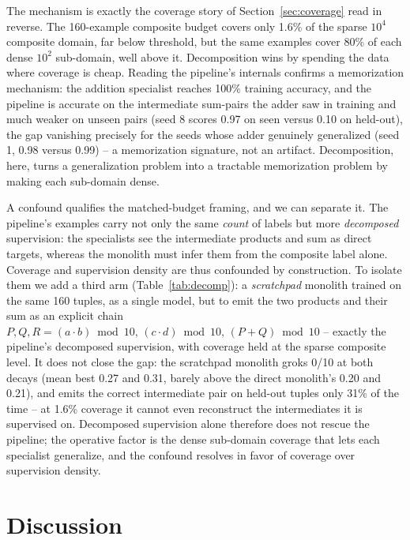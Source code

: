 \documentclass[10pt]{article} %
\begin{document}
The mechanism is exactly the coverage story of Section~\ref{sec:coverage} read in reverse. The
160-example composite budget covers only 1.6\% of the sparse $10^4$ composite domain, far below
threshold, but the same examples cover 80\% of each dense $10^2$ sub-domain, well above it.
Decomposition wins by spending the data where coverage is cheap. Reading the pipeline's internals
confirms a memorization mechanism: the addition specialist reaches 100\% training accuracy, and the
pipeline is accurate on the intermediate sum-pairs the adder saw in training and much weaker on
unseen pairs (seed 8 scores 0.97 on seen versus 0.10 on held-out), the gap vanishing precisely for
the seeds whose adder genuinely generalized (seed 1, 0.98 versus 0.99) -- a memorization signature,
not an artifact. Decomposition, here, turns a generalization problem into a tractable memorization
problem by making each sub-domain dense.

A confound qualifies the matched-budget framing, and we can separate it. The pipeline's examples
carry not only the same \emph{count} of labels but more \emph{decomposed} supervision: the
specialists see the intermediate products and sum as direct targets, whereas the monolith must infer
them from the composite label alone. Coverage and supervision density are thus confounded by
construction. To isolate them we add a third arm (Table~\ref{tab:decomp}): a \emph{scratchpad}
monolith trained on the same 160 tuples, as a single model, but to emit the two products and their
sum as an explicit chain $P,Q,R=(a\cdot b)\bmod 10,\,(c\cdot d)\bmod 10,\,(P{+}Q)\bmod 10$ --
exactly the pipeline's decomposed supervision, with coverage held at the sparse composite level. It
does not close the gap: the scratchpad monolith groks 0/10 at both decays (mean best 0.27 and 0.31,
barely above the direct monolith's 0.20 and 0.21), and emits the correct intermediate pair on
held-out tuples only 31\% of the time -- at 1.6\% coverage it cannot even reconstruct the
intermediates it is supervised on. Decomposed supervision alone therefore does not rescue the
pipeline; the operative factor is the dense sub-domain coverage that lets each specialist generalize,
and the confound resolves in favor of coverage over supervision density.

\section{Discussion}
\label{sec:discussion}
\end{document}

